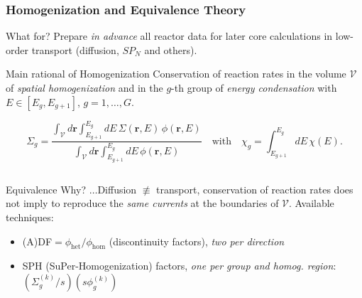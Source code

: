 \begin{frame}
  \frametitle{Homogenization and Equivalence Theory}
  \begin{block}{} \begin{flushright}
  \textcolor{ceared1}{\Large What for?} Prepare \emph{in advance} all reactor data for later core calculations in \textcolor{ceablue1}{low-order transport} (diffusion, $SP_N$ and others). \end{flushright}
  \end{block}\vspace{5mm}
  \begin{alertblock}{Main rational of Homogenization}
    Conservation of reaction rates in the volume $\mathcal{V}$ of
    \emph{spatial homogenization} and
    in the $g$-th group of \emph{energy condensation} with
    $E \in [E_g, E_{g+1}]$, $g = 1, \ldots, G$.
  \end{alertblock}
  \[
  \Sigma_g = \frac{\displaystyle
    \int_{\mathcal{V}} d\mathbf{r} \int_{E_{g+1}}^{E_g} dE \,
      \Sigma(\mathbf{r}, E) \, \phi(\mathbf{r}, E) }{\displaystyle
    \int_{\mathcal{V}} d\mathbf{r} \int_{E_{g+1}}^{E_g} dE \, \phi(\mathbf{r}, E)
    } \quad \text{with} \quad \chi_g = \int_{E_{g+1}}^{E_g} dE \, \chi(E).
  \]
  \begin{columns}
      \begin{block}{Equivalence}
      \textcolor{ceared1}{\Large Why?} $\ldots$Diffusion $\not\equiv$ transport, conservation of reaction rates does not imply to reproduce the \emph{same currents} at the boundaries of $\mathcal{V}$. Available techniques:
      \begin{itemize}
        \item (A)DF$ = \phi_{\text{het}}/\phi_{\text{hom}} $ (discontinuity factors), \emph{two per direction}
        \item SPH (SuPer-Homogenization) factors, \emph{one per group and homog. region}: $(\Sigma^{(k)}_g / s)(s\phi^{(k)}_g)$
      \end{itemize}
    \end{block}
     \centering
    \def\wdt{2.5}
    \def\ymin{0.25}
  \end{columns}
\end{frame}
